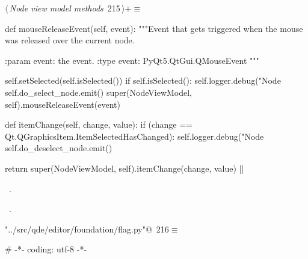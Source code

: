 \documentclass[%
    a4paper,    %
    justified,  %
    nobib,      %
    openany     %
]{tufte-book}
\makeatletter
\renewcommand{\label}[1]{\@tufte@label{##1}}%
\makeatother
\begin{document}
\begin{fullwidth}
\begin{flushleft}
\begin{minipage}{\linewidth}
\begin{list}{}{\setlength{\itemsep}{-\parsep}\setlength{\itemindent}{-\leftmargin}}
\item{}
\end{list}
\end{minipage}\vspace{4ex}
\end{flushleft}
\begin{flushleft} \small
\begin{minipage}{\linewidth}\label{scrap219}\raggedright\small
{} $\langle\,${\itshape Node view model methods}\nobreak\ {\footnotesize {215}}$\,\rangle+\equiv$
\vspace{-1ex}
\begin{pythoncode}
def mouseReleaseEvent(self, event):
    """Event that gets triggered when the mouse was released over the current
    node.

    :param event: the event.
    :type  event: PyQt5.QtGui.QMouseEvent
    """

    self.setSelected(self.isSelected())
    if self.isSelected():
        self.logger.debug("Node %
        self.do_select_node.emit()
    super(NodeViewModel, self).mouseReleaseEvent(event)

def itemChange(self, change, value):
    if (change == Qt.QGraphicsItem.ItemSelectedHasChanged):
        self.logger.debug("Node %
        self.do_deselect_node.emit()

    return super(NodeViewModel, self).itemChange(change, value)
|\NWsep|
\end{pythoncode}
\vspace{1.5ex}
\footnotesize
\begin{list}{}{\setlength{\itemsep}{-\parsep}\setlength{\itemindent}{-\leftmargin}}
\item \NWtxtMacroDefBy\ .
\item \NWtxtMacroRefIn\ .

\item{}
\end{list}
\end{minipage}\vspace{4ex}
\end{flushleft}

\begin{flushleft} \small
\begin{minipage}{\linewidth}\label{scrap220}\raggedright\small
{} \verb@"../src/qde/editor/foundation/flag.py"@\nobreak\ {\footnotesize {216}}$\equiv$
\vspace{-1ex}
\begin{pythoncode}
# -*- coding: utf-8 -*-


\end{pythoncode}
\end{minipage}
\end{flushleft}
\end{fullwidth}
\end{document}
